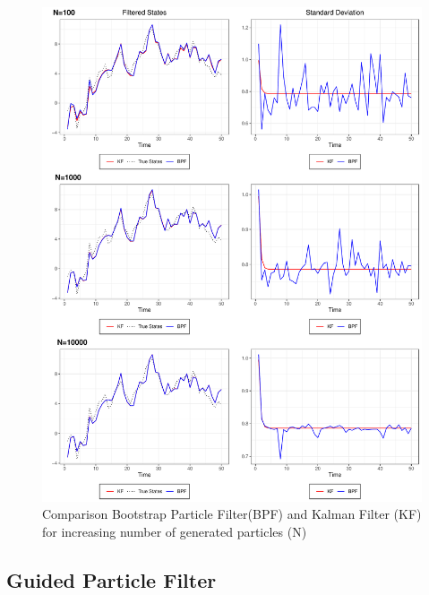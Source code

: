\documentclass[
]{book}
\theoremstyle{break}
\theoremstyle{nonumberplain}
\begin{document}
\begin{figure}[H]

{\centering \includegraphics{prova_knit_finale_files/figure-latex/myfig4-1} 

}

\caption{Comparison Bootstrap Particle Filter(BPF) and Kalman Filter (KF) for increasing number of generated particles (N)}\label{fig:myfig4}
\end{figure}

\hfill\break

\subsection{Guided Particle Filter}
\end{document}
